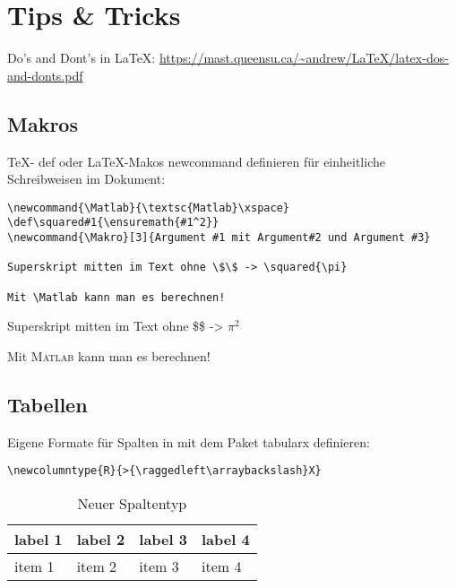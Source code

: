 \chapter{Tips \& Tricks}

Do's and Dont's in \LaTeX:
\url{https://mast.queensu.ca/~andrew/LaTeX/latex-dos-and-donts.pdf}

\section{Makros}
\label{sec:makros}

\TeX- \textsf{def} oder \LaTeX-Makos \textsf{newcommand}
definieren für einheitliche Schreibweisen im Dokument:
%
\begin{verbatim}
\newcommand{\Matlab}{\textsc{Matlab}\xspace}
\def\squared#1{\ensuremath{#1^2}}
\newcommand{\Makro}[3]{Argument #1 mit Argument#2 und Argument #3}

Superskript mitten im Text ohne \$\$ -> \squared{\pi}

Mit \Matlab kann man es berechnen!

\end{verbatim}
\newcommand{\Matlab}{\textsc{Matlab}\xspace}
\def\Makro#1#2#3{Argument #1 mit Argument#2 und Argument #3}
\def\squared#1{\ensuremath{#1^2}}

Superskript mitten im Text ohne \$\$ -> \squared{\pi}

Mit \Matlab kann man es berechnen!


\section{Tabellen}

Eigene Formate für Spalten in  mit dem Paket
\textsf{tabularx} definieren:
%
\begin{verbatim}
\newcolumntype{R}{>{\raggedleft\arraybackslash}X}
\end{verbatim}

\begin{table}[h!!]
 \caption{Neuer Spaltentyp}
 \label{tab:tabularx}
  \centering
 \begin{tabularx}{\textwidth}{ |l|R|l|R| }
  \hline
  label 1 & label 2 & label 3 & label 4 \\
  \hline 
  item 1  & item 2  & item 3  & item 4  \\
  \hline
\end{tabularx}
\end{table}


